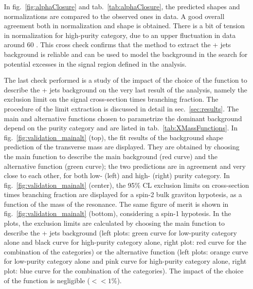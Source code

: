 \noindent In fig.~\ref{fig:alphaClosure} and tab.~\ref{tab:alphaClosure}, the predicted shapes and normalizations are compared to the observed ones in data. 
A good overall agreement both in normalization and shape is obtained. There is a bit of tension in normalization for high-purity category, due to an upper fluctuation in data around 60 \GeV. This cross check confirms that the method to extract the \V + jets background is reliable and can be used to model the background in the search for potential excesses in the signal region defined in the analysis.

\vspace*{1\baselineskip}

\noindent The last check performed is a study of the impact of the choice of the function to describe the \V + jets background on the very last result of the analysis, namely the exclusion limit on the signal cross-section times branching fraction. The procedure of the limit extraction is discussed in detail in sec.~\ref{sec:results}. The main and alternative functions chosen to parametrize the dominant background depend on the purity category and are listed in tab.~\ref{tab:XMassFunctions}. In fig.~\ref{fig:validation_mainalt} (top), the fit results of the background shape prediction of the transverse mass are displayed. They are obtained by choosing the main function to describe the main background (red curve) and the alternative function (green curve); the two predictions are in agreement and very close to each other, for both low- (left) and high- (right) purity category. In fig.~\ref{fig:validation_mainalt} (center), the 95\% CL exclusion limits on cross-section times branching fraction are displayed for a spin-2 bulk graviton hypotesis, as a function of the mass of the resonance. The same figure of merit is shown in fig.~\ref{fig:validation_mainalt} (bottom), considering a spin-1 \Wp hypotesis. In the plots, the exclusion limits are calculated by choosing the main function to describe the \V + jets background (left plots: green curve for low-purity category alone and black curve for high-purity category alone, right plot: red curve for the combination of the categories) or the alternative function (left plots: orange curve for low-purity category alone and pink curve for high-purity category alone, right plot: blue curve for the combination of the categories). The impact of the choice of the function is negligible ($<<1 \%$).


